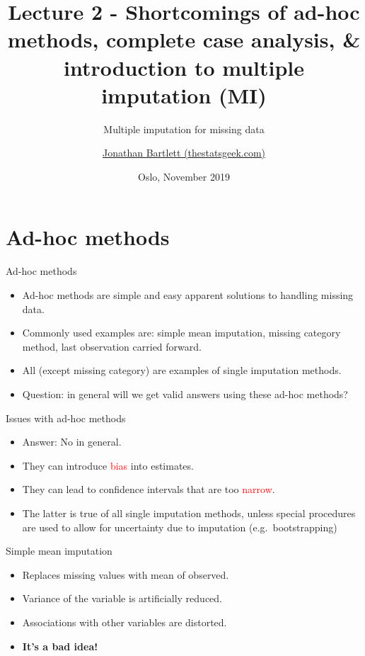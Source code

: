 \documentclass[ignorenonframetext,]{beamer}
\title{Lecture 2 - Shortcomings of ad-hoc methods, complete case analysis, \&
introduction to multiple imputation (MI)}
\subtitle{Multiple imputation for missing data}
\author{\href{https://thestatsgeek.com}{Jonathan Bartlett (thestatsgeek.com)}}
\date{Oslo, November 2019}
\providecommand{\tightlist}{%
  \setlength{\itemsep}{0pt}\setlength{\parskip}{0pt}}
\begin{document}
\frame{\titlepage}

\begin{frame}
\tableofcontents[hideallsubsections]
\end{frame}
\hypertarget{ad-hoc-methods}{%
\section{Ad-hoc methods}\label{ad-hoc-methods}}

\begin{frame}{Ad-hoc methods}
\protect\hypertarget{ad-hoc-methods-1}{}

\begin{itemize}
\tightlist
\item
  Ad-hoc methods are simple and easy apparent solutions to handling
  missing data.
\item
  Commonly used examples are: simple mean imputation, missing category
  method, last observation carried forward.
\item
  All (except missing category) are examples of single imputation
  methods.
\item
  Question: in general will we get valid answers using these ad-hoc
  methods?
\end{itemize}

\end{frame}

\begin{frame}{Issues with ad-hoc methods}
\protect\hypertarget{issues-with-ad-hoc-methods}{}

\begin{itemize}
\tightlist
\item
  Answer: No in general.
\item
  They can introduce \textcolor{red}{bias} into estimates.
\item
  They can lead to confidence intervals that are too
  \textcolor{red}{narrow}.
\item
  The latter is true of all single imputation methods, unless special
  procedures are used to allow for uncertainty due to imputation
  (e.g.~bootstrapping)
\end{itemize}

\end{frame}

\begin{frame}{Simple mean imputation}
\protect\hypertarget{simple-mean-imputation}{}

\begin{itemize}
\tightlist
\item
  Replaces missing values with mean of observed.
\item
  Variance of the variable is artificially reduced.
\item
  Associations with other variables are distorted.
\item
  \textbf{It's a bad idea!}
\end{itemize}

\end{frame}
\end{document}
